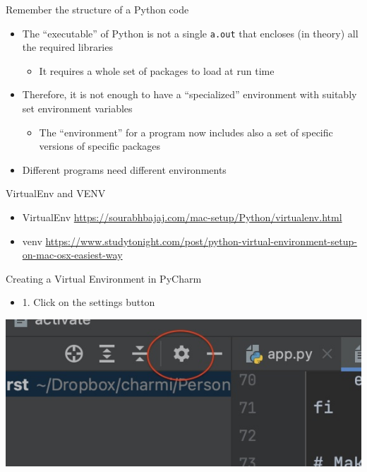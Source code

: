 \documentclass{beamer}
\begin{document}
\begin{frame}
{\centerline{Remember the structure of a Python code}}
\begin{itemize}
    \item The ``executable'' of Python is not a single \texttt{a.out} that encloses (in theory) all the required libraries
    \begin{itemize}
    \item It requires a whole set of packages to load at run time
\end{itemize} 
    \item Therefore, it is not enough to have a ``specialized'' environment with suitably set environment variables
    \begin{itemize}
        \item The ``environment'' for a program now includes also a set of specific versions of specific packages
    \end{itemize} 
    \item Different programs need different environments
\end{itemize} 

\end{frame}

\begin{frame}
{\centerline{VirtualEnv and VENV}}
\begin{itemize}
    \item VirtualEnv \url{https://sourabhbajaj.com/mac-setup/Python/virtualenv.html}
    \item venv \url{https://www.studytonight.com/post/python-virtual-environment-setup-on-mac-osx-easiest-way}
\end{itemize} 

\end{frame}



\begin{frame}
{\centerline{Creating a Virtual Environment in PyCharm}}
\begin{itemize}
    \item 1. Click on the settings button
\end{itemize} 
\begin{center}
    \includegraphics[width=\textwidth]{Coding/PyCharm.Settings.jpg}
\end{center}
\end{frame}
\end{document}
